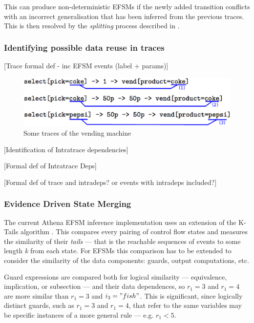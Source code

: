 This can produce non-deterministic EFSMs if the newly added transition conflicts with an incorrect generalisation that has been inferred from the previous traces. This is then resolved by the \emph{splitting} process described in .

\subsubsection{Identifying possible data reuse in traces}
\label{IntratraceDependencies}

[Trace formal def - inc EFSM events (label + params)]

\begin{figure}[h]
\begin{center}
\includegraphics[width=12cm]{figures/efsm/intratracedeps.eps}
\caption{Some traces of the vending machine}
\label{fig:pta}
\end{center}
\end{figure}

[Identification of Intratrace dependencies]

[Formal def of Intratrace Deps]

[Formal def of trace and intradeps? or events with intradeps included?]

\subsubsection{Evidence Driven State Merging}
\label{EDSM}

The current Athena EFSM inference implementation uses an extension of the K-Tails algorithm \cite{}. This compares every pairing of control flow states and measures the similarity of their \emph{tails} --- that is the reachable sequences of events to some length \emph{k} from each state. For EFSMs this comparison has to be extended to consider the similarity of the data components: guards, output computations, etc. 

Guard expressions are compared both for logical similarity --- equivalence, implication, or subsection --- and their data dependences, so $r_1 = 3$ and $r_1 = 4$ are more similar than $r_1 = 3$ and $i_3 = "fish"$. This is significant, since logically distinct guards, such as $r_1 = 3$ and $r_1 = 4$, that refer to the same variables may be specific instances of a more general rule --- e.g. $r_1 < 5$.

